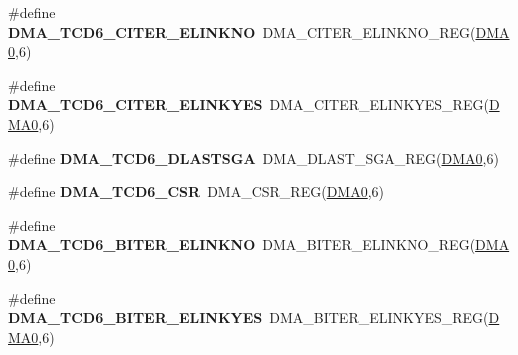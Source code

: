 \begin{DoxyCompactItemize}
\item 
\#define {\bfseries D\+M\+A\+\_\+\+T\+C\+D6\+\_\+\+C\+I\+T\+E\+R\+\_\+\+E\+L\+I\+N\+K\+NO}~D\+M\+A\+\_\+\+C\+I\+T\+E\+R\+\_\+\+E\+L\+I\+N\+K\+N\+O\+\_\+\+R\+EG(\hyperlink{group__DMA__Peripheral__Access__Layer_ga4103044f9ca209772f513dc694513ffb}{D\+M\+A0},6)\hypertarget{group__DMA__Register__Accessor__Macros_gae0ec616b075a507b1d33d7783bd9e5a1}{}\label{group__DMA__Register__Accessor__Macros_gae0ec616b075a507b1d33d7783bd9e5a1}

\item 
\#define {\bfseries D\+M\+A\+\_\+\+T\+C\+D6\+\_\+\+C\+I\+T\+E\+R\+\_\+\+E\+L\+I\+N\+K\+Y\+ES}~D\+M\+A\+\_\+\+C\+I\+T\+E\+R\+\_\+\+E\+L\+I\+N\+K\+Y\+E\+S\+\_\+\+R\+EG(\hyperlink{group__DMA__Peripheral__Access__Layer_ga4103044f9ca209772f513dc694513ffb}{D\+M\+A0},6)\hypertarget{group__DMA__Register__Accessor__Macros_ga3e433ef28a7aafd62a976c1537b586a1}{}\label{group__DMA__Register__Accessor__Macros_ga3e433ef28a7aafd62a976c1537b586a1}

\item 
\#define {\bfseries D\+M\+A\+\_\+\+T\+C\+D6\+\_\+\+D\+L\+A\+S\+T\+S\+GA}~D\+M\+A\+\_\+\+D\+L\+A\+S\+T\+\_\+\+S\+G\+A\+\_\+\+R\+EG(\hyperlink{group__DMA__Peripheral__Access__Layer_ga4103044f9ca209772f513dc694513ffb}{D\+M\+A0},6)\hypertarget{group__DMA__Register__Accessor__Macros_ga462831fecef10ad2b3be07101cc4a0cb}{}\label{group__DMA__Register__Accessor__Macros_ga462831fecef10ad2b3be07101cc4a0cb}

\item 
\#define {\bfseries D\+M\+A\+\_\+\+T\+C\+D6\+\_\+\+C\+SR}~D\+M\+A\+\_\+\+C\+S\+R\+\_\+\+R\+EG(\hyperlink{group__DMA__Peripheral__Access__Layer_ga4103044f9ca209772f513dc694513ffb}{D\+M\+A0},6)\hypertarget{group__DMA__Register__Accessor__Macros_gaafd4e9ae86d78c4a625a97dbf5871935}{}\label{group__DMA__Register__Accessor__Macros_gaafd4e9ae86d78c4a625a97dbf5871935}

\item 
\#define {\bfseries D\+M\+A\+\_\+\+T\+C\+D6\+\_\+\+B\+I\+T\+E\+R\+\_\+\+E\+L\+I\+N\+K\+NO}~D\+M\+A\+\_\+\+B\+I\+T\+E\+R\+\_\+\+E\+L\+I\+N\+K\+N\+O\+\_\+\+R\+EG(\hyperlink{group__DMA__Peripheral__Access__Layer_ga4103044f9ca209772f513dc694513ffb}{D\+M\+A0},6)\hypertarget{group__DMA__Register__Accessor__Macros_ga48649fc22420475f667d80c10c46ed68}{}\label{group__DMA__Register__Accessor__Macros_ga48649fc22420475f667d80c10c46ed68}

\item 
\#define {\bfseries D\+M\+A\+\_\+\+T\+C\+D6\+\_\+\+B\+I\+T\+E\+R\+\_\+\+E\+L\+I\+N\+K\+Y\+ES}~D\+M\+A\+\_\+\+B\+I\+T\+E\+R\+\_\+\+E\+L\+I\+N\+K\+Y\+E\+S\+\_\+\+R\+EG(\hyperlink{group__DMA__Peripheral__Access__Layer_ga4103044f9ca209772f513dc694513ffb}{D\+M\+A0},6)\hypertarget{group__DMA__Register__Accessor__Macros_ga6fb4f9b6a33d34236f2d0dbaabbe44b1}{}\label{group__DMA__Register__Accessor__Macros_ga6fb4f9b6a33d34236f2d0dbaabbe44b1}


\end{DoxyCompactItemize}
